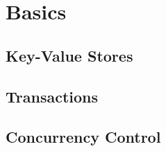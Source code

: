 \section{Basics}



\subsection{Key-Value Stores}



\subsection{Transactions}




\subsection{Concurrency Control}






